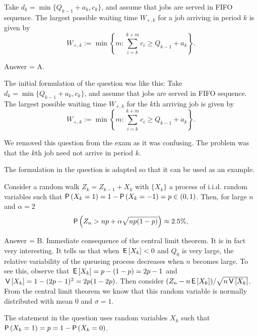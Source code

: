 \begin{exercise}[201902]
Take $d_k = \min\{Q_{k-1}+a_k, c_k\}$, and assume that jobs are served in
 FIFO sequence. The largest possible waiting time $W_{+, k}$ for a job arriving in period $k$ is given by 
 \begin{equation*}
 W_{+,k}:= \min\left\{m: \sum_{i=k}^{k+m} c_i \geq
 Q_{k-1}+a_k\right\}.
 \end{equation*}

\begin{solution}
Answer = A.



The initial formulation of the question was like this: Take $d_k = \min\{Q_{k-1}+a_k, c_k\}$, and assume that jobs are served in
 FIFO sequence. The largest possible waiting time $W_{+, k}$ for the $k$th arriving job is given by 
 \begin{equation*}
 W_{+,k}:= \min\left\{m: \sum_{i=k}^{k+m} c_i \geq
 Q_{k-1}+a_k\right\}.
 \end{equation*}

 We removed this question from the exam as it was confusing. The problem was that the $k$th job need not arrive in period $k$.

 The formulation in the question is adapted so that it can be used as an example. 

\end{solution}
\end{exercise}

\begin{exercise}[201902]
 Consider a random walk $Z_k = Z_{k-1} + X_k$ with $\{X_k\}$ a process of i.i.d. random variables such that $\P{X_k=1} = 1-\P{X_k=-1} = p \in (0, 1)$. Then, for large $n$ and $\alpha = 2$
 \begin{equation*}
 \P{Z_n > np + \alpha \sqrt{np(1-p)}} \approx 2.5\%, 
 \end{equation*}


\begin{solution}
Answer = B. Immediate consequence of the central limit theorem. It is in fact very interesting. It tells us that when $\,\mathsf{E}\left[X_k\right] < 0$ and $Q_0$ is very large, the relative variability of the queueing process decreases when $n$ becomes large. To see this, observe that $\,\mathsf{E}\left[X_k\right] = p - (1-p)=2p-1$ and $\,\mathsf{V}\left[X_k\right] = 1 - (2p-1)^2 = 2p(1-2p)$. Then consider $(Z_n - n\,\mathsf{E}\left[X_k\right])/\sqrt{n\,\mathsf{V}\left[X_k\right]}$. From the central limit theorem we know that this random variable is normally distributed with mean 0 and $\sigma=1$. 

The statement in the question uses random variables $X_k$ such that $\P{X_k=1}=p = 1- \P{X_k=0}$. 
\end{solution}
\end{exercise}

